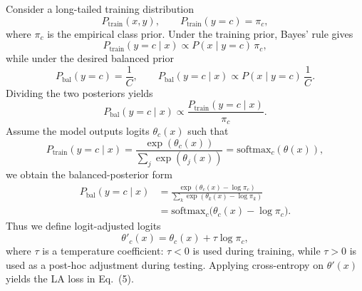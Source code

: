 Consider a long-tailed training distribution
\[
P_{\text{train}}(x,y), \qquad P_{\text{train}}(y=c)=\pi_c,
\]
where $\pi_c$ is the empirical class prior.  
Under the training prior, Bayes' rule gives
\[
P_{\text{train}}(y=c \mid x)
\propto P(x \mid y=c)\,\pi_c,
\]
while under the desired balanced prior
\[
P_{\text{bal}}(y=c)=\frac{1}{C},
\qquad
P_{\text{bal}}(y=c \mid x)
\propto P(x \mid y=c)\,\frac{1}{C}.
\]
Dividing the two posteriors yields
\[
P_{\text{bal}}(y=c \mid x)
\propto
\frac{P_{\text{train}}(y=c \mid x)}{\pi_c}.
\]
Assume the model outputs logits $\theta_c(x)$ such that
\[
P_{\text{train}}(y=c \mid x)
=
\frac{\exp(\theta_c(x))}{\sum_j \exp(\theta_j(x))}
=
\text{softmax}_c(\theta(x)),
\]
we obtain the balanced-posterior form
\[
\begin{aligned}
P_{\text{bal}}(y=c \mid x)
&= \frac{\exp(\theta_c(x)-\log\pi_c)}
        {\sum_k \exp(\theta_k(x)-\log\pi_k)} \\
&= \text{softmax}_c\!\big(\theta_c(x)-\log\pi_c\big).
\end{aligned}
\]
Thus we define logit-adjusted logits
\[
\theta'_c(x)=\theta_c(x)+\tau\log\pi_c,
\]
where $\tau$ is a temperature coefficient: $\tau<0$ is used during training, while $\tau>0$ is used as a post-hoc adjustment during testing. Applying cross-entropy on $\theta'(x)$ yields the LA loss in Eq.~(5).

